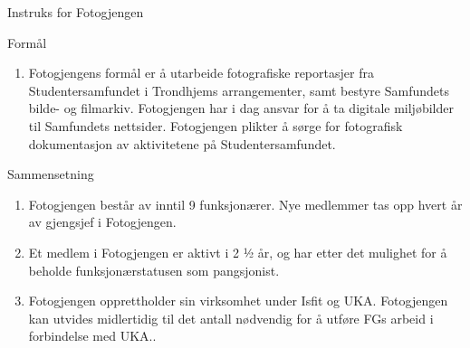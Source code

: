 \begin{instruks*}{Instruks for Fotogjengen}

    \begin{instruksledd}{Formål}
        \begin{enumerate}
            \item Fotogjengens formål er å utarbeide fotografiske reportasjer fra Studentersamfundet i
                Trondhjems arrangementer, samt bestyre Samfundets bilde- og filmarkiv. Fotogjengen har i dag ansvar
                for å ta digitale miljøbilder til Samfundets nettsider. Fotogjengen plikter å sørge for fotografisk
                dokumentasjon av aktivitetene på Studentersamfundet.
        \end{enumerate}
    \end{instruksledd}
    
    \begin{instruksledd}{Sammensetning}
        \begin{enumerate} 
            \item Fotogjengen består av inntil 9 funksjonærer. Nye medlemmer tas opp hvert år av
                gjengsjef i Fotogjengen.
            \item Et medlem i Fotogjengen er aktivt i 2 ½ år, og har etter det mulighet for å beholde
                funksjonærstatusen som pangsjonist.
            \item Fotogjengen opprettholder sin virksomhet under Isfit og UKA. Fotogjengen kan utvides
                midlertidig til det antall nødvendig for å utføre FGs arbeid i forbindelse med UKA..
        \end{enumerate}
    \end{instruksledd}


\end{instruks*}
